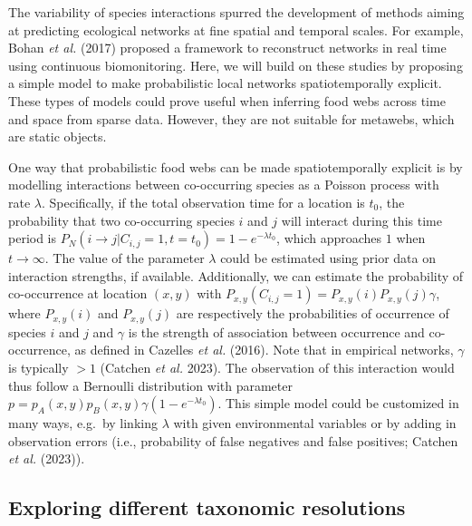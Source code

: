 \documentclass[11pt]{article}
\begin{document}
The variability of species interactions spurred the development of
methods aiming at predicting ecological networks at fine spatial and
temporal scales. For example, Bohan \emph{et al.} (2017) proposed a
framework to reconstruct networks in real time using continuous
biomonitoring. Here, we will build on these studies by proposing a
simple model to make probabilistic local networks spatiotemporally
explicit. These types of models could prove useful when inferring food
webs across time and space from sparse data. However, they are not
suitable for metawebs, which are static objects.

One way that probabilistic food webs can be made spatiotemporally
explicit is by modelling interactions between co-occurring species as a
Poisson process with rate \(\lambda\). Specifically, if the total
observation time for a location is \(t_0\), the probability that two
co-occurring species \(i\) and \(j\) will interact during this time
period is
\(P_N(i \rightarrow j | C_{i,j} = 1, t = t_0) = 1-e^{-\lambda t_0}\),
which approaches \(1\) when \(t \to \infty\). The value of the parameter
\(\lambda\) could be estimated using prior data on interaction
strengths, if available. Additionally, we can estimate the probability
of co-occurrence at location \((x,y)\) with
\(P_{x,y}(C_{i,j} = 1) = P_{x,y}(i) P_{x,y}(j)\gamma\), where
\(P_{x,y}(i)\) and \(P_{x,y}(j)\) are respectively the probabilities of
occurrence of species \(i\) and \(j\) and \(\gamma\) is the strength of
association between occurrence and co-occurrence, as defined in Cazelles
\emph{et al.} (2016). Note that in empirical networks, \(\gamma\) is
typically \(> 1\) (Catchen \emph{et al.} 2023). The observation of this
interaction would thus follow a Bernoulli distribution with parameter
\(p = p_A(x,y)p_B(x,y)\gamma(1-e^{-\lambda t_0})\). This simple model
could be customized in many ways, e.g.~by linking \(\lambda\) with given
environmental variables or by adding in observation errors (i.e.,
probability of false negatives and false positives; Catchen \emph{et
al.} (2023)).

\hypertarget{exploring-different-taxonomic-resolutions}{%
\subsection{Exploring different taxonomic
resolutions}\label{exploring-different-taxonomic-resolutions}}
\end{document}
